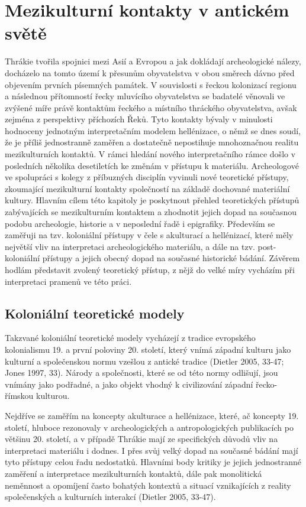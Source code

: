 \chapter{Mezikulturní kontakty v antickém světě}
Thrákie tvořila spojnici mezi Asií a Evropou a jak dokládají archeologické nálezy, docházelo na tomto území k přesunům obyvatelstva v obou směrech dávno před objevením prvních písemných památek. V souvislosti s řeckou kolonizací regionu a následnou přítomností řecky mluvícího obyvatelstva se badatelé věnovali ve zvýšené míře právě kontaktům řeckého a místního thráckého obyvatelstva, avšak zejména z perspektivy příchozích Řeků. Tyto kontakty bývaly v minulosti hodnoceny jednotným interpretačním modelem hellénizace, o němž se dnes soudí, že je příliš jednostranně zaměřen a dostatečně nepostihuje mnohoznačnou realitu mezikulturních kontaktů. V rámci hledání nového interpretačního rámce došlo v posledních několika desetiletích ke změnám v přístupu k materiálu. Archeologové ve spolupráci s kolegy z příbuzných disciplín vyvinuli nové teoretické přístupy, zkoumající mezikulturní kontakty společností na základě dochované materiální kultury. Hlavním cílem této kapitoly je poskytnout přehled teoretických přístupů zabývajících se mezikulturním kontaktem a zhodnotit jejich dopad na současnou podobu archeologie, historie a v neposlední řadě i epigrafiky. Především se zaměřuji na tzv. koloniální přístupy v čele s akulturací a hellénizací, které měly největší vliv na interpretaci archeologického materiálu, a dále na tzv. post-koloniální přístupy a jejich obecný dopad na současné historické bádání. Závěrem hodlám představit zvolený teoretický přístup, z nějž do velké míry vycházím při interpretaci pramenů ve této práci.

\section[koloniální-teoretické-modely]{Koloniální teoretické modely}

Takzvané koloniální teoretické modely vycházejí z tradice evropského kolonialismu 19. a první poloviny 20. století, který vnímá západní kulturu jako kulturní a společenskou normu vzešlou z antické tradice (Dietler 2005, 33-47; Jones 1997, 33). Národy a společnosti, které se od této normy odlišují, jsou vnímány jako podřadné, a jako objekt vhodný k civilizování západní řecko-římskou kulturou.

Nejdříve se zaměřím na koncepty akulturace a hellénizace, které, ač koncepty 19. století, hluboce rezonovaly v archeologických a antropologických publikacích po většinu 20. století, a v případě Thrákie mají ze specifických důvodů vliv na interpretaci materiálu i dodnes. I přes svůj velký dopad na současné bádání mají tyto přístupy celou řadu nedostatků. Hlavními body kritiky je jejich jednostranné zaměření a interpretace mezikulturních kontaktů, dále pak monolitická neměnnost a opomíjení často bohatých kontextů a situací vznikajících z reality společenských a kulturních interakcí (Dietler 2005, 33-47).

